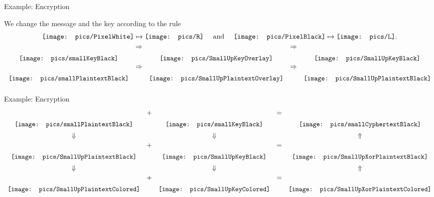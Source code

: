 \documentclass{beamer}
\newcommand{\pxWhite}{
 {\mathchoice
  {\texttt{[image: pics/PixelWhite]}}
  {\texttt{[image: pics/PixelWhite]}}
  {\texttt{[image: pics/PixelWhite]}}
  {\texttt{[image: pics/PixelWhite]}}
 }
}
\newcommand{\LL}{\mathord{\texttt{[image: pics/L]}}}
\newcommand{\RR}{\mathord{\texttt{[image: pics/R]}}}
\newcommand{\pxBlack}{\mathord{\texttt{[image: pics/PixelBlack]}}}
\newcommand{\smKeyBlack}{\mathord{\texttt{[image: pics/smallKeyBlack]}}}
\newcommand{\smMesBlack}{\mathord{\texttt{[image: pics/smallPlaintextBlack]}}}
\newcommand{\smCyphBlack}{\mathord{\texttt{[image: pics/smallCyphertextBlack]}}}
\newcommand{\smUpKeyBlack}{\mathord{\texttt{[image: pics/SmallUpKeyBlack]}}}
\newcommand{\smUpMesBlack}{\mathord{\texttt{[image: pics/SmallUpPlaintextBlack]}}}
\newcommand{\smUpCyphBlack}{\mathord{\texttt{[image: pics/SmallUpCyphertextBlack]}}}
\newcommand{\smUpKeyColored}{\mathord{\texttt{[image: pics/SmallUpKeyColored]}}}
\newcommand{\smUpMesColored}{\mathord{\texttt{[image: pics/SmallUpPlaintextColored]}}}
\newcommand{\smUpKeyOverlay}{\mathord{\texttt{[image: pics/SmallUpKeyOverlay]}}}
\newcommand{\smUpMesOverlay}{\mathord{\texttt{[image: pics/SmallUpPlaintextOverlay]}}}
\newcommand{\smUpCyphOverlay}{\mathord{\texttt{[image: pics/SmallUpCyphertextOverlay]}}}
\newcommand{\smUpXorMesColored}{\mathord{\texttt{[image: pics/SmallUpXorPlaintextColored]}}}
\newcommand{\smUpXorMesBlack}{\mathord{\texttt{[image: pics/SmallUpXorPlaintextBlack]}}}
\begin{document}
\begin{frame}{Example: Encryption}

We change the message and the key according to the rule
\begin{equation*}
\pxWhite \mapsto \RR \quad\text{ and }\quad \pxBlack \mapsto \LL.
\end{equation*}
\begin{equation*}
\begin{array}{ccccc}
\smKeyBlack & \raisebox{4ex}{$\Rightarrow$} & \smUpKeyOverlay & \raisebox{4ex}{$\Rightarrow$} & \smUpKeyBlack \vspace{0.5em}\\
\smMesBlack & \raisebox{4ex}{$\Rightarrow$} & \smUpMesOverlay & \raisebox{4ex}{$\Rightarrow$} & \smUpMesBlack \vspace{0.5em} \\
\end{array}
\end{equation*}
\end{frame}



\begin{frame}{Example: Encryption}

\begin{equation*}
\begin{array}{ccccc}
\smMesBlack & \raisebox{4ex}{+} & \smKeyBlack & \raisebox{4ex}{=} & \smCyphBlack \vspace{0.5em}\\
\Downarrow &  & \Downarrow& & \Uparrow \vspace{0.5em}\\
\smUpMesBlack & \raisebox{4ex}{+} & \smUpKeyBlack & \raisebox{4ex}{=} & \smUpXorMesBlack \vspace{0.5em} \\
\Downarrow &  & \Downarrow& & \Uparrow \vspace{0.5em}\\
\smUpMesColored & \raisebox{4ex}{+} & \smUpKeyColored & \raisebox{4ex}{=} & \smUpXorMesColored
\end{array}
\end{equation*}

\end{frame}
\end{document}
